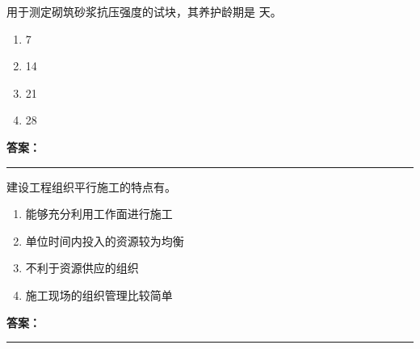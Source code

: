 \documentclass[UTF8,fontset=fandol,11pt]{ctexart}
\newcommand{\answerline}{\textcolor{answerred}{\rule{2.4cm}{0.7pt}}}
\begin{document}
\begin{quizbox}[title={乱序第 231 题｜第六章砌筑工程}]

用于测定砌筑砂浆抗压强度的试块，其养护龄期是 天。\\

\begin{enumerate}[label=\Alph*.]

\item 7

\item 14

\item 21

\item 28

\end{enumerate}

\textbf{\textcolor{answerred}{答案：}} \answerline

\end{quizbox}

\vspace{0.2em}

\begin{quizbox}[title={乱序第 232 题｜第十章流水施工原理}]

建设工程组织平行施工的特点有。\\

\begin{enumerate}[label=\Alph*.]

\item 能够充分利用工作面进行施工

\item 单位时间内投入的资源较为均衡

\item 不利于资源供应的组织

\item 施工现场的组织管理比较简单

\end{enumerate}

\textbf{\textcolor{answerred}{答案：}} \answerline

\end{quizbox}

\vspace{0.2em}
\end{document}
